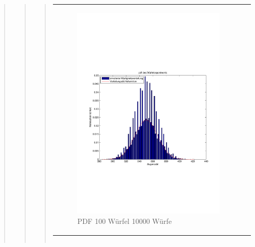 \begin{quote}
\begin{quote}
\begin{quote}
\begin{center}
\begin{tabular}{ll}
\begin{minipage}{0.6\textwidth}
                     \begin{figure}[H]
                        \label{fig:}
                        \includegraphics[scale=0.5, trim = 2cm 6.5cm 1.5cm 8.5cm, clip]{./Bilder/100wuerfelpdf} %
                        \caption{PDF 100 Würfel 10000 Würfe}
                    \end{figure}
               \vspace{-1.5em}

                \end{minipage}

            \end{tabular}
            \end{center}

            \begin{center}
            \begin{tabular}{ll}


\end{tabular}
\end{center}
\end{quote}
\end{quote}
\end{quote}
